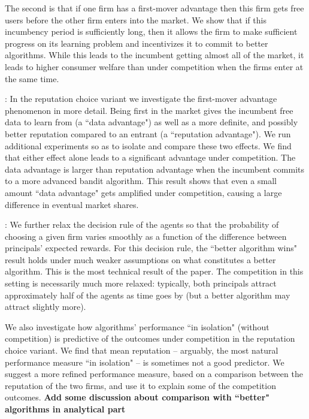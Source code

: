 The second is that if one firm has a first-mover advantage then this firm gets free users before the other firm enters into the market. We show that if this incumbency period is sufficiently long, then it allows the firm to make sufficient progress on its learning problem and incentivizes it to commit to better algorithms. While this leads to the incumbent getting almost all of the market, it leads to higher consumer welfare than under competition when the firms enter at the same time.


: In the reputation choice variant we investigate the first-mover advantage phenomenon in more detail. Being first in the market gives the incumbent free data to learn from (a ``data advantage") as well as a more definite, and possibly better reputation compared to an entrant (a ``reputation advantage"). We run additional experiments so as to isolate and compare these two effects. We find that either effect alone leads to a significant advantage under competition. The data advantage is larger than reputation advantage when the incumbent commits to a more advanced bandit algorithm. This result shows that even a small amount ``data advantage" gets amplified under competition, causing a large difference in eventual market shares.

: We further relax the decision rule of the agents so that the probability of choosing a given firm varies smoothly as a function of the difference between  principals' expected rewards. For this decision rule, the ``better algorithm wins" result holds under much weaker assumptions on what constitutes a better algorithm. This is the most technical result of the paper. The competition in this setting is necessarily much more relaxed: typically, both principals attract approximately half of the agents as time goes by (but a better algorithm may attract slightly more).

 We also investigate how algorithms' performance ``in isolation" (without competition) is predictive of the outcomes under competition in the reputation choice variant. We find that mean reputation -- arguably, the most natural performance measure ``in isolation" -- is sometimes not a good predictor. We suggest a more refined performance measure, based on a comparison between the reputation of the two firms, and use it to explain some of the competition outcomes.
\textbf{Add some discussion about comparison with ``better" algorithms in analytical part}

